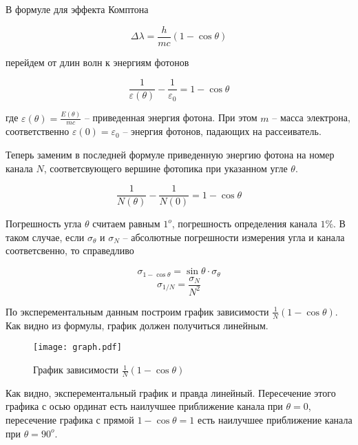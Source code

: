     В формуле для эффекта Комптона 

    \begin{equation}
        \Delta \lambda = \frac{h}{mc} (1 - \cos \theta)
    \end{equation}

    перейдем от длин волн к энергиям фотонов

    \begin{equation}
        \frac{1}{\varepsilon(\theta)} - \frac{1}{\varepsilon_0} = 1 - \cos \theta
    \end{equation}

    где $\displaystyle \varepsilon(\theta) = \frac{E(\theta)}{mc}$ -- приведенная энергия фотона. 
    При этом $m$ -- масса электрона, соответственно $\varepsilon(0) = \varepsilon_0$ -- 
    энергия фотонов, падающих на рассеиватель.

    Теперь заменим в последней формуле приведенную энергию фотона на номер канала $N$, соответсвующего
    вершине фотопика при указанном угле $\theta$.

    \begin{equation}
        \frac{1}{N(\theta)} - \frac{1}{N(0)} = 1 - \cos \theta
    \end{equation}

    

    Погрешность угла $\theta$ считаем равным $1^o$, погрешность определения канала $1\%$. В таком случае,
    если $\sigma_{\theta}$ и $\sigma_N$ -- абсолютные погрешности измерения угла и канала соответсвенно,
    то справедливо
    
    \[ \sigma_{1-\cos \theta} = \sin\theta \cdot \sigma_{\theta} \]
    \[ \sigma_{1/N} = \frac{\sigma_N}{N^2} \]

    По эксперементальным данным построим график зависимости $\displaystyle \frac{1}{N}(1 - \cos \theta)$.
    Как видно из формулы, график должен получиться линейным.

    \begin{figure}
        \centering
        \texttt{[image: graph.pdf]}
        \caption{График зависимости $\frac{1}{N}(1 - \cos \theta)$}
        \label{fig:graph}
    \end{figure}

    Как видно, эксперементальный график и правда линейный. Пересечение этого графика с осью ординат
    есть наилучшее приближение канала при $\theta = 0$, пересечение графика с прямой $1 - \cos \theta = 1$
    есть наилучшее приближение канала при $\theta = 90^o$.

